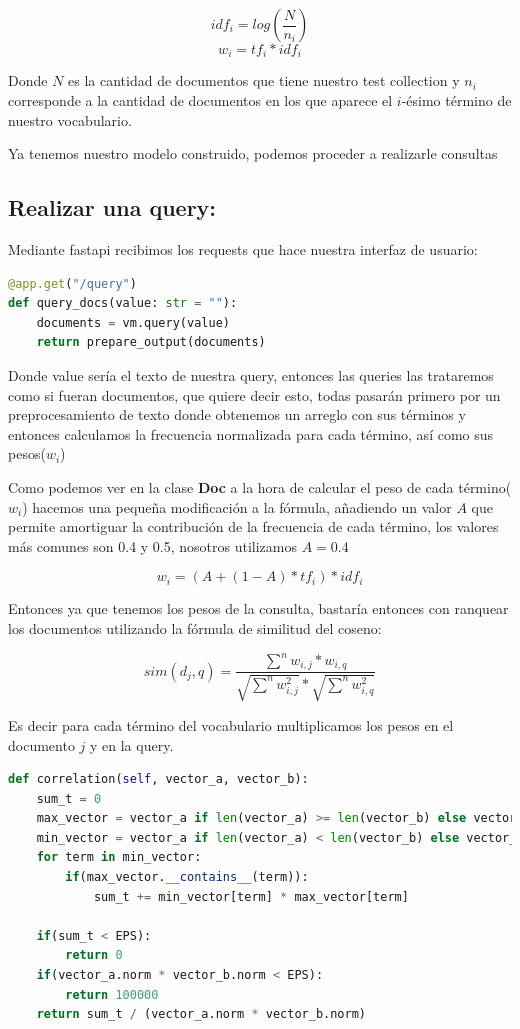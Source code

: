 \documentclass{llncs}
\begin{document}
$$idf_i = log(\frac{N}{n_i})$$
$$ w_i = tf_i * idf_i$$

Donde $N$ es la cantidad de documentos que tiene nuestro test collection y $n_i$ corresponde a la cantidad de documentos en los que aparece el $i$-ésimo término de nuestro vocabulario.

Ya tenemos nuestro modelo construido, podemos proceder a realizarle consultas

\subsection{Realizar una query:}

Mediante fastapi recibimos los requests que hace nuestra interfaz de usuario:

\begin{lstlisting}[language=Python]
@app.get("/query")
def query_docs(value: str = ""):
    documents = vm.query(value)
    return prepare_output(documents)
\end{lstlisting}

Donde value sería el texto de nuestra query, entonces las queries las trataremos como si fueran documentos, que quiere decir esto, todas pasarán primero por un preprocesamiento de texto donde obtenemos un arreglo con sus términos y entonces calculamos la frecuencia normalizada para cada término, así como sus pesos($w_i$)


Como podemos ver en la clase \textbf{Doc} a la hora de calcular el peso de cada término($w_i$) hacemos una pequeña modificación a la fórmula, añadiendo un valor $A$ que permite amortiguar la contribución de la frecuencia de cada término, los valores más comunes son 0.4 y 0.5, nosotros utilizamos $A = 0.4$


$$ w_i = (A + (1 - A) * tf_i) * idf_i $$


Entonces ya que tenemos los pesos de la consulta, bastaría entonces con ranquear los documentos utilizando la fórmula de similitud del coseno:


$$ sim(d_j, q) = \frac{\sum^n w_{i,j} * w_{i,q}}{\sqrt{\sum^n w^2_{i,j}} * \sqrt{\sum^n w^2_{i,q}}} $$


Es decir para cada término del vocabulario multiplicamos los pesos en el documento $j$ y en la query.

\begin{lstlisting}[language=Python]
def correlation(self, vector_a, vector_b):
    sum_t = 0
    max_vector = vector_a if len(vector_a) >= len(vector_b) else vector_b
    min_vector = vector_a if len(vector_a) < len(vector_b) else vector_b
    for term in min_vector:
        if(max_vector.__contains__(term)):
            sum_t += min_vector[term] * max_vector[term]

    if(sum_t < EPS):
        return 0
    if(vector_a.norm * vector_b.norm < EPS):
        return 100000
    return sum_t / (vector_a.norm * vector_b.norm)
\end{lstlisting}
\end{document}
